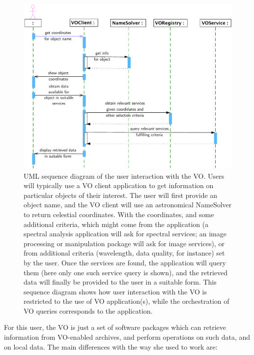 		\begin{figure}[tbp]
			\centering
				\includegraphics[width=\columnwidth]
				{fig/VOClientSequenceDiagram.pdf}
			\caption[Sequence diagram: User VO interaction]
			{
				UML sequence diagram of the user interaction with
				the VO. Users will typically use a VO client
				application to get information on particular
				objects of their interest. The user will first
				provide an object name, and the VO client will use
				an astronomical NameSolver to return celestial
				coordinates. With the coordinates, and some
				additional criteria, which might come from the
				application (a spectral analysis application will
				ask for spectral services; an image processing or
				manipulation package will ask for image services),
				or from additional criteria (wavelength, data
				quality, for instance) set by the user. Once the
				services are found, the application will query them
				(here only one such service query is shown), and
				the retrieved data will finally be provided to the
				user in a suitable form. This sequence diagram
				shows how user interaction with the VO is
				restricted to the use of VO application(s), while
				the orchestration of VO queries corresponds to the
				application.
			}
			\label{fig:fig_VOClientSequenceDiagram}
		\end{figure}
		
		For this user, the VO is just a set of software packages
		which can retrieve information from VO-enabled archives,
		and perform operations on such data, and on local data. The
		main differences with the way she used to work are:
		

